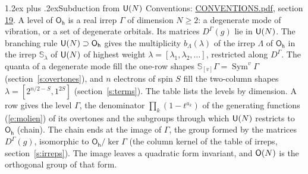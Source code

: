 \documentclass[10pt,a4paper]{article}
\makeatletter
\renewcommand\section{\@startsection{section}{1}{\z@}{-3ex plus -1ex minus -.2ex}%
  {1.2ex plus .2ex}{\normalfont\large\sffamily\bfseries\color{parttitle}}}
\numberwithin{equation}{section}
\newcommand{\grp}[1]{\mathsf{#1}}
\newcommand{\repD}[1]{D^{#1}}
\newcommand{\schur}[1]{\mathbb{S}_{#1}}
\newcommand{\shape}[1]{[#1]}
\makeatother
\begin{document}
\section{Subduction from \texorpdfstring{$\grp{U(\mathnormal{N})}$}{U(N)}}\label{s:unitary}
Conventions: \href{../../CONVENTIONS.pdf}{CONVENTIONS.pdf}, section \href{../../CONVENTIONS.pdf\#conv.19}{19}.
\leavevmode\label{n:local.level.dimension}A level of $\grp{O_{h}}$ is a real irrep $\Gamma$ of dimension $N \ge 2$: a degenerate mode of vibration, or a set of degenerate orbitals. \label{n:group.unitary}Its matrices $\repD{\Gamma}(g)$ lie in $\grp{U(\mathnormal{N})}$. \label{n:irrep.schur}\label{n:shape.partition}\label{n:local.partition}\label{n:function.multiplicity.unitary}The branching rule $\grp{U(\mathnormal{N})} \supset \grp{O_{h}}$ gives the multiplicity $b_\Lambda(\lambda)$ of the irrep $\Lambda$ of $\grp{O_{h}}$ in the irrep $\schur{\lambda}$ of $\grp{U(\mathnormal{N})}$ of highest weight $\lambda = \shape{\lambda_1, \lambda_2, \dots}$, restricted along $\repD{\Gamma}$. \label{n:local.partition.power}\label{n:local.electrons}\label{n:local.spin}The quanta of a degenerate mode fill the one-row shapes $\schur{\shape{v}}\Gamma = \operatorname{Sym}^{v}\Gamma$ (section~\ref{s:overtones}), and $n$ electrons of spin $S$ fill the two-column shapes $\lambda = \shape{2^{n/2-S}, 1^{2S}}$ (section~\ref{s:terms}).
The table lists the levels by dimension. \label{n:head.level}\label{n:head.denominator}\label{n:index.overtone.denominator}\label{n:head.chain}A row gives the level $\Gamma$, the denominator $\prod_k (1 - t^{a_k})$ of the generating functions (\ref{e:molien}) of its overtones and the subgroups through which $\grp{U(\mathnormal{N})}$ restricts to $\grp{O_{h}}$ (chain). The chain ends at the image of $\Gamma$, the group formed by the matrices $\repD{\Gamma}(g)$, isomorphic to $\grp{O_{h}}/\ker\Gamma$ (the column kernel of the table of irreps, section~\ref{s:irreps}). The image leaves a quadratic form invariant, and $\grp{O(\mathnormal{N})}$ is the orthogonal group of that form.
\end{document}

